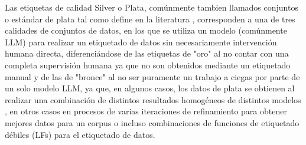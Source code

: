 Las etiquetas de calidad Silver o Plata, comúnmente tambien llamados conjuntos o estándar de plata tal como define en la literatura \cite{SilverLabel2024} \cite{Li_2023}, corresponden a una de tres calidades de conjuntos de datos, en los que se utiliza un modelo (comúnmente LLM) para realizar un etiquetado de datos sin necesariamente intervención humana directa, diferenciándose de las etiquetas de "oro" al no contar con una completa supervisión humana ya que no son obtenidos mediante un etiquetado manual y de las de "bronce" al no ser puramente un trabajo a ciegas por parte de un solo modelo LLM, ya que, en algunos casos, los datos de plata se obtienen al realizar una combinación de distintos resultados homogéneos de distintos modelos \cite{CALBCSilverStandardCorpus2010}, en otros casos en procesos de varias iteraciones de refinamiento para obtener mejores datos para un corpus \cite{SilverLabel2024} o incluso combinaciones de funciones de etiquetado débiles (LFs) para el etiquetado de datos\cite{álvarezreliableprogrammaticweaksupervision2025}.
